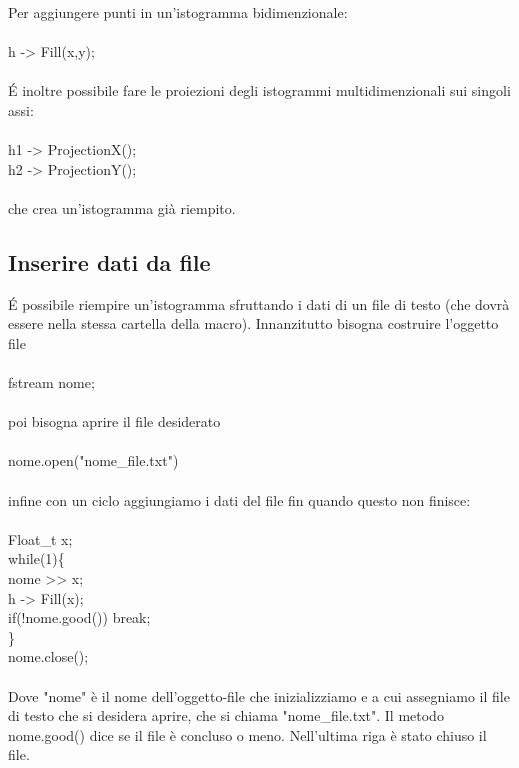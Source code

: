 \documentclass[10pt,a4paper]{article}
\begin{document}
Per aggiungere punti in un'istogramma bidimenzionale:\\\\
h -> Fill(x,y);\\\\
\'{E} inoltre possibile fare le proiezioni degli istogrammi multidimenzionali sui singoli assi:\\\\
h1 -> ProjectionX();\\
h2 -> ProjectionY();\\\\
che crea un'istogramma già riempito.\\

\subsection{Inserire dati da file}
\'{E} possibile riempire un'istogramma sfruttando i dati di un file di testo (che dovrà essere nella stessa cartella della macro). Innanzitutto bisogna costruire l'oggetto file\\\\
fstream nome;\\\\
poi bisogna aprire il file desiderato\\\\
nome.open("nome\_file.txt")\\\\
infine con un ciclo aggiungiamo i dati del file fin quando questo non finisce:\\\\
Float\_t x;\\
while(1)\{\\
	nome >> x;\\
	h -> Fill(x);\\
	if(!nome.good()) break;\\
\}\\
nome.close();\\\\

Dove "nome" è il nome dell'oggetto-file che inizializziamo e a cui assegniamo il file di testo che si desidera aprire, che si chiama "nome\_file.txt". Il metodo nome.good() dice se il file è concluso o meno. Nell'ultima riga è stato chiuso il file. 
\end{document}
